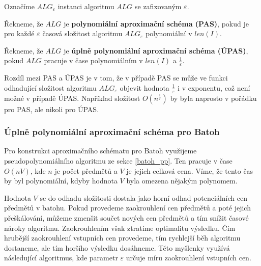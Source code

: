 \documentclass[11pt]{report} %
\numberwithin{equation}{section}
\begin{document}
Označíme $ALG_\varepsilon$ instanci algoritmu $ALG$ se zafixovaným $\varepsilon$.

Řekneme, že $ALG$ je \textbf{polynomiální aproximační schéma (PAS)}, pokud je pro každé $\varepsilon$ časová složitost algoritmu $ALG_\varepsilon$ polynomiální v $len(I)$.

Řekneme, že $ALG$ je \textbf{úplně polynomiální aproximační schéma (ÚPAS)}, pokud $ALG$ pracuje v čase polynomiálním v $len(I)$ a $\frac{1}{\varepsilon}$.

Rozdíl mezi PAS a ÚPAS je v tom, že v případě PAS se může ve funkci odhadující složitost algoritmu $ALG_\varepsilon$ objevit hodnota $\frac{1}{\varepsilon}$ i v exponentu, což není možné v případě ÚPAS. Například složitost $O(n^\frac{1}{\varepsilon})$ by byla naprosto v pořádku pro PAS, ale nikoli pro ÚPAS.

\subsubsection{Úplně polynomiální aproximační schéma pro Batoh}
Pro konstrukci aproximačního schématu pro Batoh využijeme pseudopolynomiálního algoritmu ze sekce \ref{batoh_pp}. 
Ten pracuje v čase $O(nV)$, kde $n$ je počet předmětů a $V$ je jejich celková cena. Víme, že tento čas by byl polynomiální, kdyby hodnota $V$ byla omezena nějakým polynomem. 

Hodnota $V$ se do odhadu složitosti dostala jako horní odhad potenciálních cen předmětů v batohu. Pokud provedeme zaokrouhlení cen předmětů a poté jejich přeškálování, můžeme zmenšit součet nových cen předmětů a tím snížit časové nároky algoritmu. Zaokrouhlením však ztratíme optimalitu výsledku. Čím hrubější zaokrouhlení vstupních cen provedeme, tím rychlejší běh algoritmu dostaneme, ale tím horšího výsledku dosáhneme. Této myšlenky využívá následující algoritmus, kde parametr $\varepsilon$ určuje míru zaokrouhlení vstupních cen.
\bigskip
\end{document}
